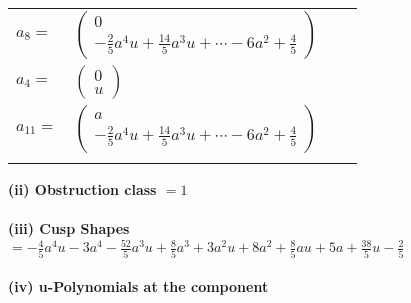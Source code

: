 \documentclass[1p]{elsarticle_modified}
\theoremstyle{definition}
\begin{document}
\begin{tabular}{m{7pt} m{180pt} m{7pt} m{180pt} }
\flushright $a_{8}=$&$\begin{pmatrix}0\\-\frac{2}{5} a^4 u+\frac{14}{5} a^3 u+\cdots-6 a^2+\frac{4}{5}\end{pmatrix}$ \\
\flushright $a_{4}=$&$\begin{pmatrix}0\\u\end{pmatrix}$ \\
\flushright $a_{11}=$&$\begin{pmatrix}a\\-\frac{2}{5} a^4 u+\frac{14}{5} a^3 u+\cdots-6 a^2+\frac{4}{5}\end{pmatrix}$\\&\end{tabular}
\flushleft \textbf{(ii) Obstruction class $= 1$}\\~\\
\flushleft \textbf{(iii) Cusp Shapes $= -\frac{4}{5} a^4 u-3 a^4-\frac{52}{5} a^3 u+\frac{8}{5} a^3+3 a^2 u+8 a^2+\frac{8}{5} a u+5 a+\frac{38}{5} u-\frac{2}{5}$}\\~\\
\newpage\renewcommand{\arraystretch}{1}
\flushleft \textbf{(iv) u-Polynomials at the component}\newline \\
\end{document}
